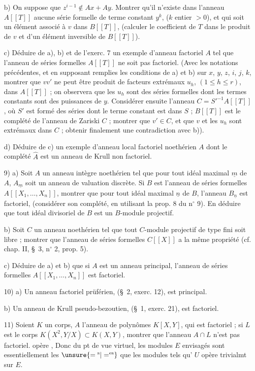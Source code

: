 b) On suppose que $z^{i-1}\notin Ax+Ay$. Montrer qu'il n'existe dans l'anneau $A[[T]]$ aucune série formelle de terme constant $y^k$, ($k$ entier $>0$), et qui soit un élément associé à $v$ dans $B[[T]]$, (calculer le coefficient de $T$ dans le produit de $v$ et d'un élément inversible de $B[[T]]$).

c) Déduire de a), b) et de l'exerc. 7 un exemple d'anneau factoriel $A$ tel que l'anneau de séries formelles $A[[T]]$ ne soit pas factoriel. (Avec les notations précédentes, et en supposant remplies les conditions de a) et b) sur $x$, $y$, $z$, $i$, $j$, $k$, montrer que $vv'$ ne peut être produit de facteurs extrémaux $u_h$, $(1\leq h\leq r)$, dans $A[[T]]$ ; on observera que les $u_h$ sont des séries formelles dont les termes constants sont des puissances de $y$. Considérer ensuite l'anneau $C=S'^{-1}A[[T]]$, où $S'$ est formé des séries dont le terme constant est dans $S$ ; $B[[T]]$ est le complété de l'anneau de Zariski $C$ ; montrer que $v'\in C$, et que $v$ et les $u_h$ sont extrémaux dans $C$ ; obtenir finalement une contradiction avec b)).

d) Déduire de c) un exemple d'anneau local factoriel noethérien $A$ dont le complété $\hat A$ est un anneau de Krull non factoriel.

9) \qquad a) Soit $A$ un anneau intègre noethérien tel que pour tout idéal maximal $\underline{m}$ de $A$, $A_{\underline{m}}$ soit un anneau de valuation discrète. Si $B$ est l'anneau de séries formelles $A[[X_1,\ldots,X_n]]$, montrer que pour tout idéal maximal $\underline{n}$ de $B$, l'anneau $B_{\underline{n}}$ est factoriel, (considérer son complété, en utilisant la prop. 8 du n$^{\circ}$ 9). En déduire que tout idéal divisoriel de $B$ est un $B$-module projectif.

b) Soit $C$ un anneau noethérien tel que tout $C$-module projectif de type fini soit libre ; montrer que l'anneau de séries formelles $C[[X]]$ a la même propriété (cf. chap. II, \S~3, n$^{\circ}$ 2, prop. 5).

c) Déduire de a) et b) que si $A$ est un anneau principal, l'anneau de séries formelles $A[[X_1,\ldots,X_n]]$ est factoriel.

10) \qquad a) Un anneau factoriel prüférien, (\S~2, exerc. 12), est principal.

b) Un anneau de Krull pseudo-bezoutien, (\S~1, exerc. 21), est factoriel.

11) Soient $K$ un corps, $A$ l'anneau de polynômes $K[X,Y]$, qui est factoriel ; si $L$ est le corps $K(X^2,Y/X)\subset K(X,Y)$, montrer que l'anneau $A\cap L$ n'est pas factoriel.
opère ,  Donc du pt de vue virtuel,  les modules $E$ envisagés sont essentiellement les $\unsure{={}^{\mathrm{s}}|=^{\mathrm{es}}}$ que les modules tels qu' $U$ opère trivialmt sur $E$.

